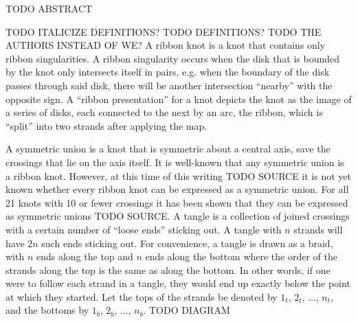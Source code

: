 

\begin{paperabstract}
TODO ABSTRACT
\end{paperabstract}
\begin{paper}
\theorems
TODO ITALICIZE DEFINITIONS?
TODO DEFINITIONS?
TODO THE AUTHORS INSTEAD OF WE?
A ribbon knot is a knot that contains only ribbon singularities.
A ribbon singularity occurs when the disk that is bounded by the knot only
intersects itself in pairs, e.g. when the boundary of the disk passes through
said disk, there will be another intersection ``nearby'' with the opposite sign.
A ``ribbon presentation'' for a knot depicts the knot as the image of a series
of disks, each connected to the next by an arc, the ribbon, which is ``split''
into two strands after applying the map.

A symmetric union is a knot that is symmetric about a central axis, save the
crossings that lie on the axis itself.
It is well-known that any symmetric union is a ribbon knot.
However, at this time of this writing TODO SOURCE it is not yet known whether
every ribbon knot can be expressed as a symmetric union.
For all 21 knots with 10 or fewer crossings it has been shown that they can be
expressed as symmetric unions TODO SOURCE.
A tangle is a collection of joined crossings with a certain number of ``loose
ends'' sticking out.
A tangle with $n$ strands will have $2n$ such ends sticking out.
For convenience, a tangle is drawn as a braid, with $n$ ends along the top and
$n$ ends along the bottom where the order of the strands along the top is the
same as along the bottom.
In other words, if one were to follow each strand in a tangle, they would end up
exactly below the point at which they started.
Let the tops of the strands be denoted by $1_t$, $2_t$, ..., $n_t$, and the
bottoms  by $1_b$, $2_b$, ..., $n_b$.
TODO DIAGRAM


\end{paper}
